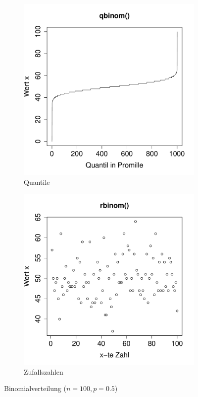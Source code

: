 \begin{figure}[h!]
\begin{subfigure}[b]{0.48\textwidth}
\includegraphics{verteilungen-020}
\caption{Quantile}
\end{subfigure}
\begin{subfigure}[b]{0.48\textwidth}
\includegraphics{verteilungen-021}
\caption{Zufallszahlen}
\end{subfigure}
\caption{Binomialverteilung ($n=100, p=0.5$)}
\label{fig:binom}
\end{figure}


